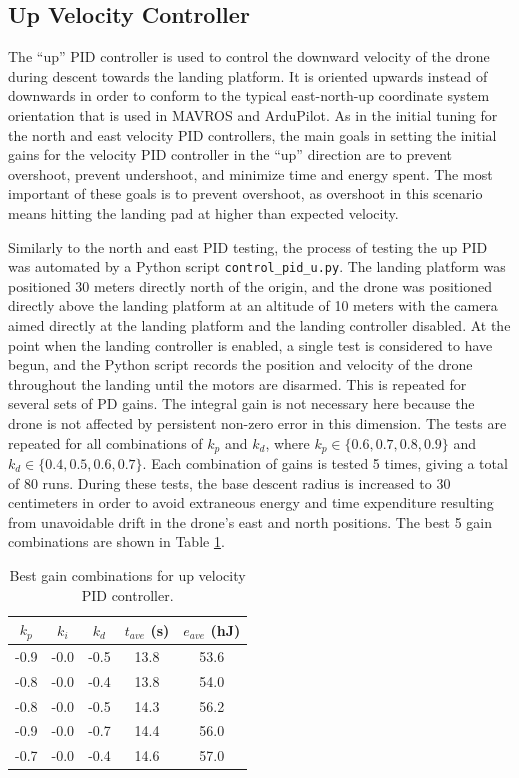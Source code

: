 \subsection{Up Velocity Controller}

The ``up'' PID controller is used to control the downward velocity of the drone during descent towards the landing platform. It is oriented upwards instead of downwards in order to conform to the typical east-north-up coordinate system orientation that is used in MAVROS and ArduPilot. As in the initial tuning for the north and east velocity PID controllers, the main goals in setting the initial gains for the velocity PID controller in the ``up'' direction are to prevent overshoot, prevent undershoot, and minimize time and energy spent. The most important of these goals is to prevent overshoot, as overshoot in this scenario means hitting the landing pad at higher than expected velocity.

Similarly to the north and east PID testing, the process of testing the up PID was automated by a Python script \texttt{control\_pid\_u.py}. The landing platform was positioned 30 meters directly north of the origin, and the drone was positioned directly above the landing platform at an altitude of 10 meters with the camera aimed directly at the landing platform and the landing controller disabled. At the point when the landing controller is enabled, a single test is considered to have begun, and the Python script records the position and velocity of the drone throughout the landing until the motors are disarmed. This is repeated for several sets of PD gains. The integral gain is not necessary here because the drone is not affected by persistent non-zero error in this dimension. The tests are repeated for all combinations of $k_p$ and $k_d$, where $k_p \in \{ 0.6, 0.7, 0.8, 0.9 \}$ and $k_d \in \{  0.4, 0.5, 0.6, 0.7 \}$. Each combination of gains is tested 5 times, giving a total of 80 runs. During these tests, the base descent radius is increased to 30 centimeters in order to avoid extraneous energy and time expenditure resulting from unavoidable drift in the drone's east and north positions. The best 5 gain combinations are shown in Table \ref{tab:up_pid_gains}.

\begin{table}[ht]
    \centering
    \begin{tabular}{|c|c|c|c|c|}
    	\hline $k_{p}$ & $k_{i}$ & $k_{d}$ & $t_{ave}$ (s) & $e_{ave}$ (hJ) \\\hline
    	-0.9 & -0.0 & -0.5 & 13.8 & 53.6 \\\hline
    	-0.8 & -0.0 & -0.4 & 13.8 & 54.0 \\\hline
    	-0.8 & -0.0 & -0.5 & 14.3 & 56.2 \\\hline
    	-0.9 & -0.0 & -0.7 & 14.4 & 56.0 \\\hline
    	-0.7 & -0.0 & -0.4 & 14.6 & 57.0 \\\hline
    \end{tabular}
    \caption{Best gain combinations for up velocity PID controller.}
    \label{tab:up_pid_gains}
\end{table}

